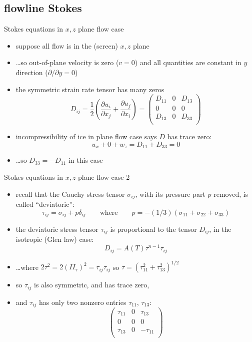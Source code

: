 \subsection{flowline Stokes}

\begin{frame}{Stokes equations in $x,z$ plane flow case}

\begin{itemize}
\item suppose all flow is in the (screen) $x,z$ plane
\item \dots so out-of-plane velocity is zero ($v=0$) and all quantities are constant in $y$ direction ($\partial/\partial y = 0$)
\item the symmetric strain rate tensor has many zeros
	$$D_{ij} = \frac{1}{2}\left(\frac{\partial u_i}{\partial x_j} + \frac{\partial u_j}{\partial x_i}\right) = \begin{pmatrix}
  	D_{11} & 0 & D_{13} \\
  	0 & 0 & 0 \\
  	D_{13} & 0 & D_{33} \\
  	\end{pmatrix}$$
\item incompressibility of ice in plane flow case says $D$ has trace zero:
	$$u_x + 0 + w_z = D_{11} + D_{33} = 0$$
\item \dots so $D_{33} = - D_{11}$ in this case
\end{itemize}
\end{frame}


\begin{frame}{Stokes equations in $x,z$ plane flow case 2}

\begin{itemize}
\item recall that the Cauchy stress tensor $\sigma_{ij}$, with its pressure part $p$ removed, is called ``deviatoric'':
	$$\tau_{ij} = \sigma_{ij} + p \delta_{ij} \qquad \text{where} \qquad p = -(1/3) (\sigma_{11} + \sigma_{22} + \sigma_{33})$$
\item the deviatoric stress tensor $\tau_{ij}$ is proportional to the tensor $D_{ij}$, in the isotropic (Glen law) case:
	$$D_{ij} = A(T) \tau^{n-1} \tau_{ij}$$
\item \dots where \quad $2 \tau^2 = 2 ({II}_\tau)^2 = \tau_{ij} \tau_{ij}$ \quad so \quad $\tau = \left(\tau_{11}^2 + \tau_{13}^2\right)^{1/2}$
\item so $\tau_{ij}$ is also symmetric, and has trace zero,
\item and $\tau_{ij}$ has only two nonzero entries $\tau_{11}$, $\tau_{13}$:
  	$$\begin{pmatrix}
  	\tau_{11} & 0 & \tau_{13} \\
  	0 & 0 & 0 \\
  	\tau_{13} & 0 & -\tau_{11} \\
  	\end{pmatrix}$$
\end{itemize}
\end{frame}


